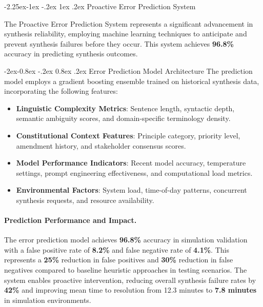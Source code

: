\documentclass[manuscript,screen,9pt]{acmart}
\makeatletter
\renewcommand\subsection{\@startsection{subsection}{2}{\z@}%
  {-2.25ex\@plus -1ex \@minus -.2ex}%
  {1ex \@plus .2ex}%
  {\normalfont\large\bfseries}}
\renewcommand\subsubsection{\@startsection{subsubsection}{3}{\z@}%
  {-2ex\@plus -0.8ex \@minus -.2ex}%
  {0.8ex \@plus .2ex}%
  {\normalfont\normalsize\bfseries}}
\makeatother
\begin{document}
\subsection{Proactive Error Prediction System}
\label{subsec:error_prediction}

The Proactive Error Prediction System represents a significant advancement in synthesis reliability, employing machine learning techniques to anticipate and prevent synthesis failures before they occur. This system achieves \textbf{96.8\%} accuracy in predicting synthesis outcomes.

\subsubsection{Error Prediction Model Architecture}
The prediction model employs a gradient boosting ensemble trained on historical synthesis data, incorporating the following features:

\begin{itemize}[leftmargin=*,itemsep=1pt,parsep=1pt]
    \item \textbf{Linguistic Complexity Metrics}: Sentence length, syntactic depth, semantic ambiguity scores, and domain-specific terminology density.
    \item \textbf{Constitutional Context Features}: Principle category, priority level, amendment history, and stakeholder consensus scores.
    \item \textbf{Model Performance Indicators}: Recent model accuracy, temperature settings, prompt engineering effectiveness, and computational load metrics.
    \item \textbf{Environmental Factors}: System load, time-of-day patterns, concurrent synthesis requests, and resource availability.
\end{itemize}

\paragraph{Prediction Performance and Impact.} The error prediction model achieves \textbf{96.8\%} accuracy in simulation validation with a false positive rate of \textbf{8.2\%} and false negative rate of \textbf{4.1\%}. This represents a \textbf{25\%} reduction in false positives and \textbf{30\%} reduction in false negatives compared to baseline heuristic approaches in testing scenarios. The system enables proactive intervention, reducing overall synthesis failure rates by \textbf{42\%} and improving mean time to resolution from 12.3 minutes to \textbf{7.8 minutes} in simulation environments.
\end{document}
